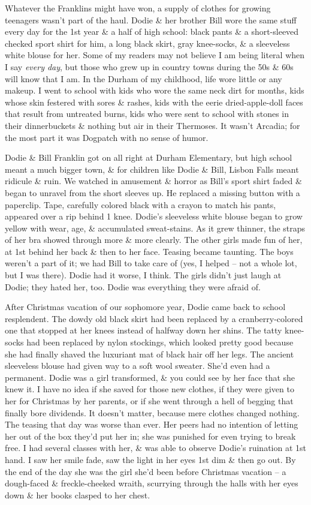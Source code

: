 \documentclass{article}
\numberwithin{equation}{section}
\begin{document}
Whatever the Franklins might have won, a supply of clothes for growing teenagers wasn't part of the haul. Dodie \& her brother Bill wore the same stuff every day for the 1st year \& a half of high school: black pants \& a short-sleeved checked sport shirt for him, a long black skirt, gray knee-socks, \& a sleeveless white blouse for her. Some of my readers may not believe I am being literal when I say \textit{every day}, but those who grew up in country towns during the 50s \& 60s will know that I am. In the Durham of my childhood, life wore little or any makeup. I went to school with kids who wore the same neck dirt for months, kids whose skin festered with sores \& rashes, kids with the eerie dried-apple-doll faces that result from untreated burns, kids who were sent to school with stones in their dinnerbuckets \& nothing but air in their Thermoses. It wasn't Arcadia; for the most part it was Dogpatch with no sense of humor.

Dodie \& Bill Franklin got on all right at Durham Elementary, but high school meant a much bigger town, \& for children like Dodie \& Bill, Lisbon Falls meant ridicule \& ruin. We watched in amusement \& horror as Bill's sport shirt faded \& began to unravel from the short sleeves up. He replaced a missing button with a paperclip. Tape, carefully colored black with a crayon to match his pants, appeared over a rip behind 1 knee. Dodie's sleeveless white blouse began to grow yellow with wear, age, \& accumulated sweat-stains. As it grew thinner, the straps of her bra showed through more \& more clearly. The other girls made fun of her, at 1st behind her back \& then to her face. Teasing became taunting. The boys weren't a part of it; we had Bill to take care of (yes, I helped -- not a whole lot, but I was there). Dodie had it worse, I think. The girls didn't just laugh at Dodie; they hated her, too. Dodie was everything they were afraid of.

After Christmas vacation of our sophomore year, Dodie came back to school resplendent. The dowdy old black skirt had been replaced by a cranberry-colored one that stopped at her knees instead of halfway down her shins. The tatty knee-socks had been replaced by nylon stockings, which looked pretty good because she had finally shaved the luxuriant mat of black hair off her legs. The ancient sleeveless blouse had given way to a soft wool sweater. She'd even had a permanent. Dodie was a girl transformed, \& you could see by her face that she knew it. I have no idea if she saved for those new clothes, if they were given to her for Christmas by her parents, or if she went through a hell of begging that finally bore dividends. It doesn't matter, because mere clothes changed nothing. The teasing that day was worse than ever. Her peers had no intention of letting her out of the box they'd put her in; she was punished for even trying to break free. I had several classes with her, \& was able to observe Dodie's ruination at 1st hand. I saw her smile fade, saw the light in her eyes 1st dim \& then go out. By the end of the day she was the girl she'd been before Christmas vacation -- a dough-faced \& freckle-cheeked wraith, scurrying through the halls with her eyes down \& her books clasped to her chest.
\end{document}
